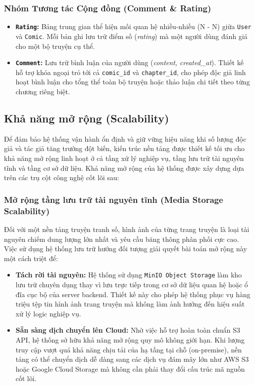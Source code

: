 \subsubsection{Nhóm Tương tác Cộng đồng (Comment \& Rating)}
\begin{itemize}
    \item \textbf{\texttt{Rating}:} Bảng trung gian thể hiện mối quan hệ nhiều-nhiều (N - N) giữa \texttt{User} và \texttt{Comic}. Mỗi bản ghi lưu trữ điểm số (\textit{rating}) mà một người dùng đánh giá cho một bộ truyện cụ thể.
    \item \textbf{\texttt{Comment}:} Lưu trữ bình luận của người dùng (\textit{content, created\_at}). Thiết kế hỗ trợ khóa ngoại trỏ tới cả \texttt{comic\_id} và \texttt{chapter\_id}, cho phép độc giả linh hoạt bình luận cho tổng thể toàn bộ truyện hoặc thảo luận chi tiết theo từng chương riêng biệt.
\end{itemize}

\subsection{Khả năng mở rộng (Scalability)}

Để đảm bảo hệ thống vận hành ổn định và giữ vững hiệu năng khi số lượng độc giả và tác giả tăng trưởng đột biến, kiến trúc nền tảng được thiết kế tối ưu cho khả năng mở rộng linh hoạt ở cả tầng xử lý nghiệp vụ, tầng lưu trữ tài nguyên tĩnh và tầng cơ sở dữ liệu. Khả năng mở rộng của hệ thống được xây dựng dựa trên các trụ cột công nghệ cốt lõi sau:

\subsubsection{Mở rộng tầng lưu trữ tài nguyên tĩnh (Media Storage Scalability)}
Đối với một nền tảng truyện tranh số, hình ảnh của từng trang truyện là loại tài nguyên chiếm dung lượng lớn nhất và yêu cầu băng thông phân phối cực cao. Việc sử dụng hệ thống lưu trữ hướng đối tượng giải quyết bài toán mở rộng này một cách triệt để:
\begin{itemize}
    \item \textbf{Tách rời tài nguyên:} Hệ thống sử dụng \texttt{MinIO Object Storage} làm kho lưu trữ chuyên dụng thay vì lưu trực tiếp trong cơ sở dữ liệu quan hệ hoặc ổ đĩa cục bộ của server backend. Thiết kế này cho phép hệ thống phục vụ hàng triệu tệp tin hình ảnh trang truyện mà không làm ảnh hưởng đến hiệu suất xử lý logic nghiệp vụ.
    \item \textbf{Sẵn sàng dịch chuyển lên Cloud:} Nhờ việc hỗ trợ hoàn toàn chuẩn S3 API, hệ thống sở hữu khả năng mở rộng quy mô không giới hạn. Khi lượng truy cập vượt quá khả năng chịu tải của hạ tầng tại chỗ (on-premise), nền tảng có thể chuyển dịch dễ dàng sang các dịch vụ đám mây lớn như AWS S3 hoặc Google Cloud Storage mà không cần phải thay đổi cấu trúc mã nguồn cốt lõi.
\end{itemize}

